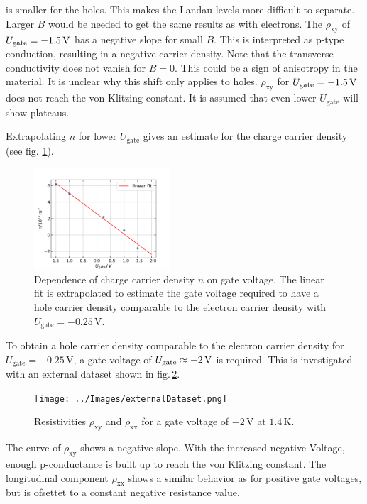 is smaller for the holes.
This makes the Landau levels more difficult to separate. 
Larger $B$ would be needed to get the same results as with electrons.
The $\rho_\text{xy}$ of $U_\text{gate} = -1.5\,\text V$ has a negative slope for small $B$.
This is interpreted as p-type conduction, resulting in a negative carrier density.
Note that the transverse conductivity does not vanish for $B=0$.
This could be a sign of anisotropy in the material.
It is unclear why this shift only applies to holes.
$\rho_\text{xy}$ for $U_\text{gate} = -1.5 \,\text V$ does not reach the von Klitzing constant.
It is assumed that even lower $U_\text{gate}$ will show plateaus.

Extrapolating $n$ for lower $U_\text{gate}$ gives an estimate for the charge carrier density (see fig. \ref{fig:extrapolating}).
\begin{figure}[h]
    \centering
    \includegraphics[width=0.45\textwidth]{../Images/extrapolatingN.png}
    \caption{
        Dependence of charge carrier density $n$ on gate voltage.
        The linear fit is extrapolated to estimate the gate voltage required to have a hole carrier density comparable to the electron carrier density with $U_\text{gate} = -0.25\,\text{V}$.}
    \label{fig:extrapolating}
\end{figure}
To obtain a hole carrier density comparable to the electron carrier density for $U_\text{gate} = -0.25\,\text{V}$,
a gate voltage of $U_\text{gate} \approx -2\,\text V$ is required.
This is investigated with an external dataset shown in fig.\,\ref{fig.externalDataset}.
\begin{figure}[h]
    \centering
    \texttt{[image: ../Images/externalDataset.png]}
    \caption{Resistivities $\rho_\text{xy}$ and $\rho_\text{xx}$ for a gate voltage of $-2\,\text{V}$ at $1.4\,\text{K}$.
    }
    \label{fig.externalDataset}
\end{figure}
The curve of $\rho_\text{xy}$ shows a negative slope. 
With the increased negative Voltage, enough p-conductance is built up to reach the von Klitzing constant.
The longitudinal component $\rho_\text{xx}$ shows a similar behavior as for positive gate voltages, but
is ofsettet to a constant negative resistance value.